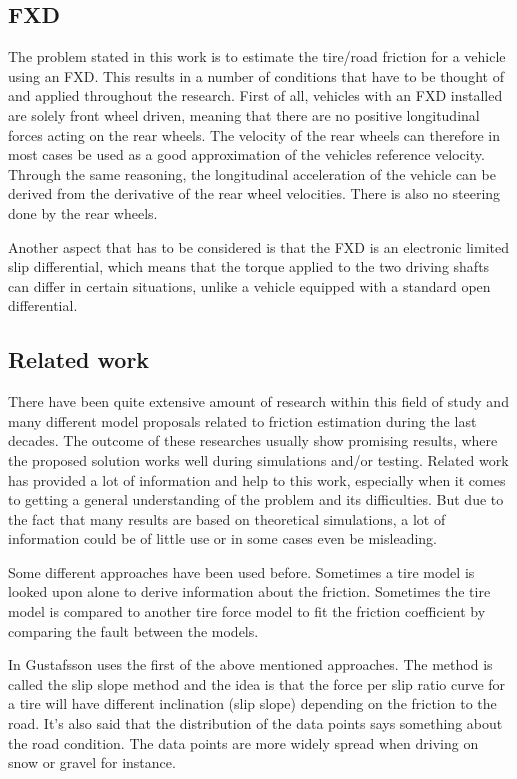\subsection{FXD}
The problem stated in this work is to estimate the tire/road friction for a vehicle using an FXD. This results in a number of conditions that have to be thought of and applied throughout the research. First of all, vehicles with an FXD installed are solely front wheel driven, meaning that there are no positive longitudinal forces acting on the rear wheels. The velocity of the rear wheels can therefore in most cases be used as a good approximation of the vehicles reference velocity. Through the same reasoning, the longitudinal acceleration of the vehicle can be derived from the derivative of the rear wheel velocities. There is also no steering done by the rear wheels.

Another aspect that has to be considered is that the FXD is an electronic limited slip differential, which means that the torque applied to the two driving shafts can differ in certain situations, unlike a vehicle equipped with a standard open differential.

\subsection{Related work}
There have been quite extensive amount of research within this field of study and many different model proposals related to friction estimation during the last decades. The outcome of these researches usually show promising results, where the proposed solution works well during simulations and/or testing. Related work has provided a lot of information and help to this work, especially when it comes to getting a general understanding of the problem and its difficulties. But due to the fact that many results are based on theoretical simulations, a lot of information could be of little use or in some cases even be misleading.

Some different approaches have been used before. Sometimes a tire model is looked upon alone to derive information about the friction. Sometimes the tire model is compared to another tire force model to fit the friction coefficient by comparing the fault between the models.

In \cite{gustafsson1997} Gustafsson uses the first of the above mentioned approaches. The method is called the slip slope method and the idea is that the force per slip ratio curve for a tire will have different inclination (slip slope) depending on the friction to the road. It's also said that the distribution of the data points says something about the road condition. The data points are more widely spread when driving on snow or gravel for instance.

